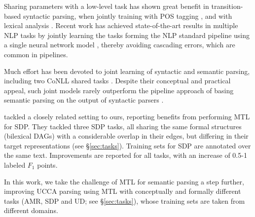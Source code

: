 \documentclass[11pt,a4paper]{article}
\begin{document}
Sharing parameters with a low-level task
has shown great benefit in transition-based syntactic parsing,
when jointly training with POS tagging
\cite{bohnet2012transition,Zhang2016StackpropagationIR}, and
with lexical analysis \cite{constant-nivre:2016:P16-1,more2016joint}.
Recent work has achieved state-of-the-art results in multiple NLP tasks
by jointly learning the tasks forming the NLP standard pipeline using 
a single neural network model \cite{collobert2011natural,D17-1206},
thereby avoiding cascading errors, which are common in pipelines.

Much effort has been devoted to joint learning of syntactic
and semantic parsing, including
two CoNLL shared tasks \cite{surdeanu2008conll,hajivc2009conll}.
Despite their conceptual and practical appeal, such joint models rarely outperform
the pipeline approach of basing semantic parsing on the output of syntactic parsers
\cite{lluis2008joint,henderson2013multilingual,D15-1169,swayamdipta-EtAl:2016:CoNLL,swayamdipta2017frame}.

\citet{P17-1186} tackled a closely related setting to ours,
reporting benefits from performing MTL for SDP.
They tackled three SDP tasks, all sharing the same formal structures (bilexical DAGs) with a considerable overlap in their edges,
but differing in their target representations  (see \S\ref{sec:tasks}).
Training sets for SDP are annotated over the same text.
Improvements are reported for all tasks, with an increase of 0.5-1 labeled $F_1$ points.


In this work, we take the challenge of MTL for semantic parsing a step further,
improving UCCA parsing using MTL with conceptually and formally different tasks (AMR, SDP and UD; see \S\ref{sec:tasks}), whose training sets are taken from different domains.
\end{document}
